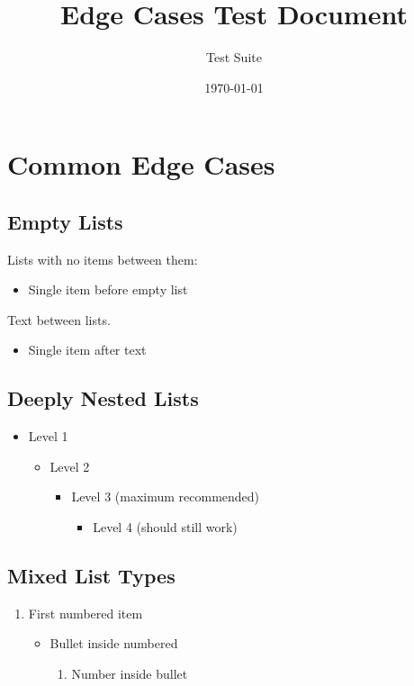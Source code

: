 \documentclass[11pt]{article}
\begin{document}
\title{Edge Cases Test Document}
\author{Test Suite}
\date{\today}
\maketitle

\section{Common Edge Cases}

\subsection{Empty Lists}
Lists with no items between them:
\begin{itemize}
\item Single item before empty list
\end{itemize}

Text between lists.

\begin{itemize}
\item Single item after text
\end{itemize}

\subsection{Deeply Nested Lists}
\begin{itemize}
\item Level 1
  \begin{itemize}
  \item Level 2
    \begin{itemize}
    \item Level 3 (maximum recommended)
      \begin{itemize}
      \item Level 4 (should still work)
      \end{itemize}
    \end{itemize}
  \end{itemize}
\end{itemize}

\subsection{Mixed List Types}
\begin{enumerate}
\item First numbered item
  \begin{itemize}
  \item Bullet inside numbered
    \begin{enumerate}
    \item Number inside bullet
    \end{enumerate}
  \end{itemize}
\end{enumerate}
\end{document}
